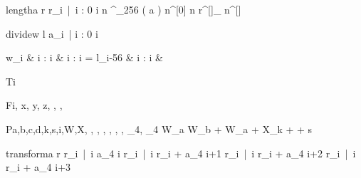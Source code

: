 \documentclass[12pt,a4paper]{book}
\begin{document}
\begin{eqcode}{length}{a}{}{}
    r \in {} \lend
    r_i\  |\  i : 0 \leq i   \lend
     n ^{\lfloor \log_{256} \left ( a \right ) \rfloor } \lend
    n^{[0]} \gets n \lend
    r^{[\iter]}_\iter \gets {} \lend %
    n^{[\iter]} \gets {} \lend
     \lend
\end{eqcode}

\begin{eqcode}{divide}{w}{}{}
    l \gets {} \lend
    a_i\   |  i : 0 \leq i \ \gets
        \begin{cases}
            w_i & i : i \leq {} \lend
              & i : i =  \lend
            l_{i-56} & i : i   & \otherwise \lend
        \end{cases} \lend
     \lend
\end{eqcode}

\begin{eqcode}{T}{i}{}{}
     \lend
\end{eqcode}

\begin{eqcode}{F}{i, x, y, z}{, , ,
}{}
        \lend
       \lend
       \lend
       \lend
    \qendif
\end{eqcode}

\begin{eqcode}{P}{a,b,c,d,k,s,i,W,X}{, , ,
, , , , _4,
}{_4}
    W_a \gets W_b + {{W_a + X_k +   + } \ll s } \lend
     \lend
\end{eqcode}

\begin{eqcode}{transform}{a}{}{}
    r \in {} \lend
    r_i\  |\  \forall i \gets a_{4 \cdot i}  \lend
    r_i\  |\  \forall i \gets r_i + a_{4 \cdot i+1}  \lend
    r_i\  |\  \forall i \gets r_i + a_{4 \cdot i+2}  \lend
    r_i\  |\  \forall i  \gets r_i + a_{4 \cdot i+3} \lend
     \lend
\end{eqcode}
\end{document}
